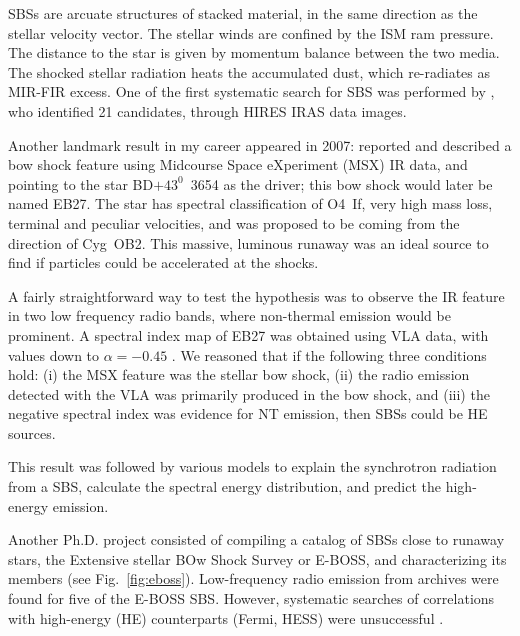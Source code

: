 \documentclass[baaa]{baaa}
\begin{document}
SBSs are arcuate structures of stacked material, in the same direction as the stellar velocity vector. The stellar winds are confined by the ISM ram pressure. The distance to the star is given by momentum balance between the two media. The shocked stellar radiation heats the accumulated dust, which re-radiates as MIR-FIR excess. One of the first systematic search for SBS was performed by \citet{noriega1997}, who identified 21 candidates, through HIRES IRAS data images. 

Another {landmark} result in my career appeared in 2007: \citet{comeron2007} reported and described a bow shock feature using Midcourse Space eXperiment (MSX) IR data, and pointing to the star BD$+43^0$~3654 as the driver; this bow shock would later be named EB27. The star has spectral classification of O4~If, very high mass loss, terminal and peculiar velocities, and was proposed to be coming from the direction of Cyg~OB2. 
This massive, luminous runaway was an ideal source to find if particles could be accelerated at the shocks.

A fairly straightforward way to test the hypothesis was to observe the IR feature in two low frequency radio bands, where non-thermal emission would be prominent. A spectral index map of EB27 was obtained using VLA data, with values down to $\alpha = -0.45$ \citep{benaglialet2010}. 
{We reasoned that if the following three conditions hold:} (i) the MSX feature was the stellar bow shock, (ii) the radio emission detected with the VLA was primarily produced in the bow shock, and (iii) the negative spectral index was evidence for NT emission, then SBSs could be HE sources. 
 
This result was followed by various models \citep[e.g.][]{delpalacio2018} to explain the {synchrotron} radiation from a SBS, calculate the spectral energy distribution, and predict the high-energy emission. 

Another Ph.D. project consisted of compiling a catalog of SBSs \citep{peri2015} close to runaway stars, the Extensive stellar BOw Shock Survey or E-BOSS, and characterizing its members (see Fig.~\ref{fig:eboss}). 
Low-frequency radio emission from archives were found for five of the E-BOSS SBS. However, systematic searches of correlations with high-energy (HE) counterparts (Fermi, HESS) were unsuccessful \citep{schulz2014,hesscoll2018}.
\end{document}
